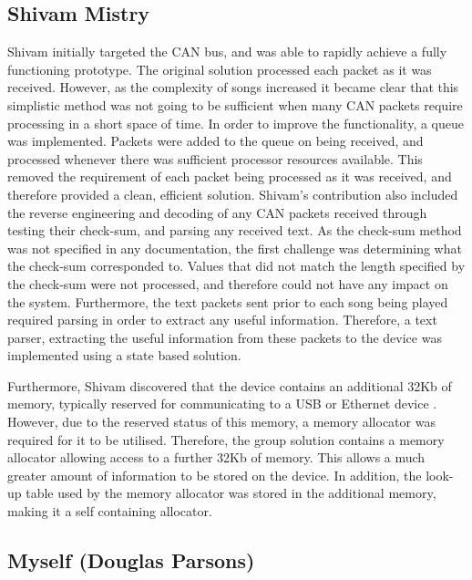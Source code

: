 \subsection*{Shivam Mistry}
Shivam initially targeted the CAN bus, and was able to rapidly achieve a fully 
functioning prototype. The original solution processed each packet as it was 
received. However, as the complexity of songs increased it became clear that this 
simplistic method was not going to be sufficient when many CAN packets require 
processing in a short space of time.
In order to improve the functionality, a queue was implemented. Packets were 
added to the queue on being received, and processed whenever there was sufficient
processor resources available.
This removed the requirement of each packet being processed as it was received,
 and therefore provided a clean, efficient solution.
Shivam's contribution also included the reverse engineering and decoding of any
 CAN packets received through testing their check-sum, and parsing any received 
text.
As the check-sum method was not specified in any documentation, the first 
challenge was determining what the check-sum corresponded to. Values that did 
not match the length specified by the check-sum were not processed, and therefore 
could not have any impact on the system. Furthermore, the text packets sent prior 
to each song being played required parsing in order to extract any useful 
information. Therefore, a text parser, extracting the useful information from 
these packets to the device was implemented using a state based solution. 
\par\bigskip\noindent
Furthermore, Shivam 
discovered that the device contains an additional 32Kb of memory, 
typically reserved for communicating to a USB or Ethernet device \cite{lpc1768-datasheet}.
However, due to the reserved status of this memory, a memory allocator was 
required for it to be utilised. 
Therefore, the group solution contains a memory allocator allowing access to 
a further 32Kb of memory. This allows a much greater amount of information to be 
stored on the device. 
In addition, the look-up table used by the memory allocator was stored in the 
additional memory, making it a self containing allocator. 

\subsection*{Myself (Douglas Parsons)}


